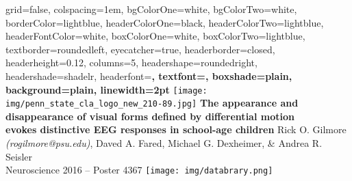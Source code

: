 \documentclass[landscape,final,paperwidth=72in,paperheight=42in,fontscale=0.285]{baposter}
\begin{document}



\begin{poster}%
  {
  grid=false,
  colspacing=1em,
  bgColorOne=white,
  bgColorTwo=white,
  borderColor=lightblue,
  headerColorOne=black,
  headerColorTwo=lightblue,
  headerFontColor=white,
  boxColorOne=white,
  boxColorTwo=lightblue,
  textborder=roundedleft,
  eyecatcher=true,
  headerborder=closed,
  headerheight=0.12\textheight,
  columns=5, %
  headershape=roundedright,
  headershade=shadelr,
  headerfont=\Large\bf\textsc, %
  textfont={\setlength{\parindent}{1.5em}},
  boxshade=plain,
  background=plain,
  linewidth=2pt
  }
  {\texttt{[image: img/penn\_state\_cla\_logo\_new\_210-89.jpg]}}
  {\bf{The appearance and disappearance of visual forms defined by differential motion \\ evokes distinctive EEG responses in school-age children} \vspace{0.2em}}
  {Rick O. Gilmore \emph{(rogilmore@psu.edu)}, Daved A. Fared, Michael G. Dexheimer, \& Andrea R. Seisler\\ \vspace{0.2em}
  Neuroscience 2016 -- Poster 4367}
 {\texttt{[image: img/databrary.png]}}


\end{poster}
\end{document}
